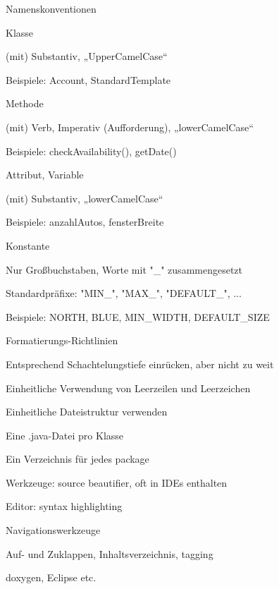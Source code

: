 \documentclass[a4paper]{article}
\begin{document}
\begin{multicols}{3}
  Namenskonventionen
  \begin{itemize*}
    \item Klasse
          \begin{itemize*}
            \item (mit) Substantiv, „UpperCamelCase“
            \item Beispiele: Account, StandardTemplate
          \end{itemize*}
    \item Methode
          \begin{itemize*}
            \item (mit) Verb, Imperativ (Aufforderung), „lowerCamelCase“
            \item Beispiele: checkAvailability(), getDate()
          \end{itemize*}
    \item Attribut, Variable
          \begin{itemize*}
            \item (mit) Substantiv, „lowerCamelCase“
            \item Beispiele: anzahlAutos, fensterBreite
          \end{itemize*}
    \item Konstante
          \begin{itemize*}
            \item Nur Großbuchstaben, Worte mit "\_" zusammengesetzt
            \item Standardpräfixe: "MIN\_", "MAX\_", "DEFAULT\_", ...
            \item Beispiele: NORTH, BLUE, MIN\_WIDTH, DEFAULT\_SIZE
          \end{itemize*}
  \end{itemize*}

  Formatierungs-Richtlinien
  \begin{itemize*}
    \item Entsprechend Schachtelungstiefe einrücken, aber nicht zu weit
    \item Einheitliche Verwendung von Leerzeilen und Leerzeichen
    \item Einheitliche Dateistruktur verwenden
          \begin{itemize*}
            \item Eine .java-Datei pro Klasse
            \item Ein Verzeichnis für jedes package
          \end{itemize*}
    \item Werkzeuge: source beautifier, oft in IDEs enthalten
    \item Editor: syntax highlighting
    \item Navigationswerkzeuge
          \begin{itemize*}
            \item Auf- und Zuklappen, Inhaltsverzeichnis, tagging
            \item doxygen, Eclipse etc.
          \end{itemize*}
  \end{itemize*}


\end{multicols}
\end{document}
